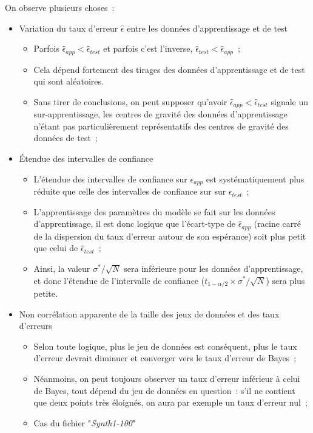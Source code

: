 \documentclass[a4paper,10pt]{report}
\begin{document}
On observe plusieurs choses~:
\begin{itemize}
	\item Variation du taux d'erreur $\hat{\epsilon}$ entre les données d'apprentissage et de test
	\begin{itemize}
		\item Parfois $\hat{\epsilon}_{app} < \hat{\epsilon}_{test}$ et parfois c'est l'inverse, $\hat{\epsilon}_{test} < \hat{\epsilon}_{app}$~;
		\item Cela dépend fortement des tirages des données d'apprentissage et de test qui sont aléatoires.
		\item Sans tirer de conclusions, on peut supposer qu'avoir $\hat{\epsilon}_{app} < \hat{\epsilon}_{test}$ signale un sur-apprentissage, les centres de gravité des données d'apprentissage n'étant pas particulièrement représentatifs des centres de gravité des données de test~;
	\end{itemize}
	\item Étendue des intervalles de confiance
	\begin{itemize}
		\item L'étendue des intervalles de confiance sur ${\epsilon}_{app}$ est systématiquement plus réduite que celle des intervalles de confiance sur sur ${\epsilon}_{test}$~;
		\item L'apprentissage des paramètres du modèle se fait sur les données d'apprentissage, il est donc logique que l'écart-type de $\hat{\epsilon}_{app}$ (racine carré de la dispersion du taux d'erreur autour de son espérance) soit plus petit que celui de $\hat{\epsilon}_{test}$~;
		\item Ainsi, la valeur $\sigma^*/\sqrt{N}$ sera inférieure pour les données d'apprentissage, et donc l'étendue de l'intervalle de confiance ($t_{1-\alpha/2} \times \sigma^*/\sqrt{N}$) sera plus petite.
	\end{itemize}
	\item Non corrélation apparente de la taille des jeux de données et des taux d'erreurs
	\begin{itemize}
		\item Selon toute logique, plus le jeu de données est conséquent, plus le taux d'erreur devrait diminuer et converger vers le taux d'erreur de Bayes~;
		\item Néanmoins, on peut toujours observer un taux d'erreur inférieur à celui de Bayes, tout dépend du jeu de données en question~: s'il ne contient que deux points très éloignés, on aura par exemple un taux d'erreur nul~;
		\item Cas du fichier "\textit{Synth1-100}"

\end{itemize}
\end{itemize}
\end{document}
